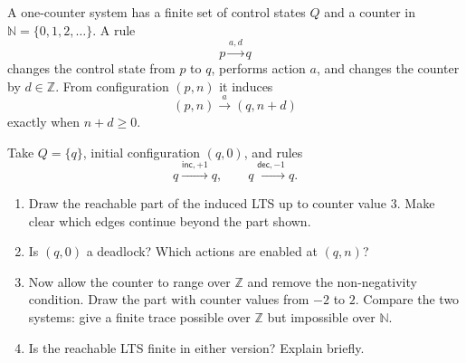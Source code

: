 \documentclass{tutorial}
\begin{document}
\begin{exercise}
A one-counter system has a finite set of control states $Q$ and a counter
in $\mathbb{N}=\{0,1,2,\ldots\}$. A rule
\[
  p\xrightarrow{a,d}q
\]
changes the control state from $p$ to $q$, performs action $a$, and changes
the counter by $d\in\mathbb{Z}$. From configuration $(p,n)$ it induces
\[
  (p,n)\xrightarrow{a}(q,n+d)
\]
exactly when $n+d\geq 0$.

Take $Q=\{q\}$, initial configuration $(q,0)$, and rules
\[
  q\xrightarrow{\mathsf{inc},+1}q,
  \qquad
  q\xrightarrow{\mathsf{dec},-1}q.
\]
\begin{enumerate}
  \item Draw the reachable part of the induced LTS up to counter value $3$.
        Make clear which edges continue beyond the part shown.
  \item Is $(q,0)$ a deadlock? Which actions are enabled at $(q,n)$?
  \item Now allow the counter to range over $\mathbb{Z}$ and remove the
        non-negativity condition. Draw the part with counter values from
        $-2$ to $2$. Compare the two systems: give a finite trace possible
        over $\mathbb{Z}$ but impossible over $\mathbb{N}$.
  \item Is the reachable LTS finite in either version? Explain briefly.
\end{enumerate}
\end{exercise}
\end{document}
